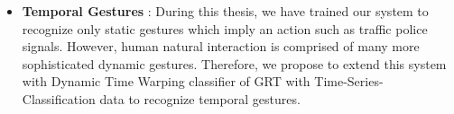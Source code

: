 \begin{itemize}
	\item \textbf{Temporal Gestures} : During this thesis, we have trained our system to recognize only static gestures which imply an action such as traffic police signals. However, human natural interaction is comprised of many more sophisticated dynamic gestures. Therefore, we propose to extend this system with Dynamic Time Warping classifier of GRT with Time-Series-Classification data to recognize temporal gestures. 
\end{itemize}


